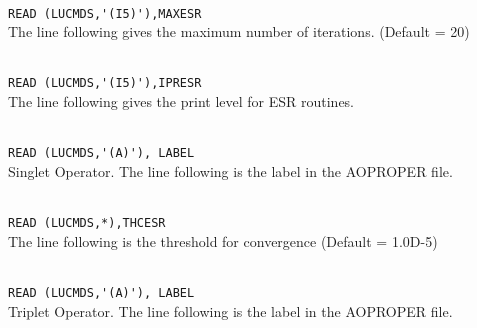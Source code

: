 \begin{description}

\item{}      \\
\verb|READ (LUCMDS,'(I5)'),MAXESR |\\
   The line following gives the maximum number of iterations.  (Default = 20)

\item{}     \\
\verb|READ (LUCMDS,'(I5)'),IPRESR |\\
   The line following gives the print level for ESR routines.

\item{}    \\
\verb|READ (LUCMDS,'(A)'), LABEL|\\
   Singlet Operator. The line following is the label in the AOPROPER file.

\item{}     \\
\verb|READ (LUCMDS,*),THCESR|\\
   The line following is the threshold for convergence (Default = 1.0D-5)

\item{}    \\
\verb|READ (LUCMDS,'(A)'), LABEL |\\
   Triplet Operator. The line following is the label in the AOPROPER file.


\end{description}




